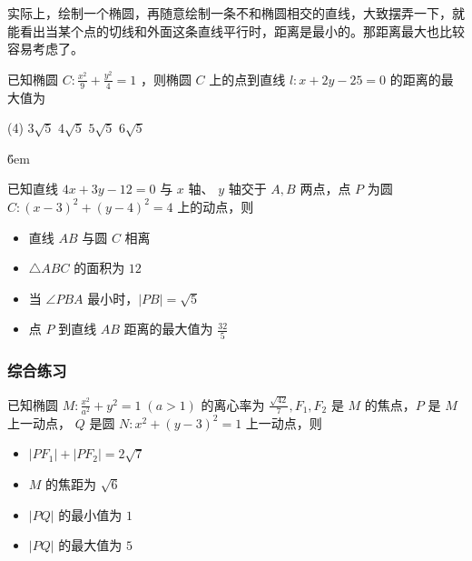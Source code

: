 \begin{tips}
    实际上，绘制一个椭圆，再随意绘制一条不和椭圆相交的直线，大致摆弄一下，就能看出当某个点的切线和外面这条直线平行时，距离是最小的。那距离最大也比较容易考虑了。
\end{tips}

\begin{example}
    已知椭圆 $C: \frac{x^{2}}{9}+\frac{y^{2}}{4}=1$ ，则椭圆 $C$ 上的点到直线 $l: x+2 y-25=0$ 的距离的最大值为
    \begin{tasks}(4)
        \task $3 \sqrt{5}$
        \task $4 \sqrt{5}$
        \task $5 \sqrt{5}$
        \task $6 \sqrt{5}$
    \end{tasks}
\end{example}

\v{6em}

\begin{problem}
已知直线 $4x+3y-12=0$ 与 $x$ 轴、 $y$ 轴交于 $A, B$ 两点，点 $P$ 为圆 $C:(x-3)^{2}+(y-4)^{2}=4$ 上的动点，则
\begin{itemize}
    \item 直线 $AB$ 与圆 $C$ 相离
    \item $\triangle ABC$ 的面积为 $12$
    \item 当 $\angle PBA$ 最小时，$|PB|=\sqrt{5}$
    \item 点 $P$ 到直线 $AB$ 距离的最大值为 $\frac{32}{5}$
\end{itemize}
\end{problem}

\subsubsection{综合练习}

\begin{problem}
已知椭圆 $M: \frac{x^{2}}{a^{2}}+y^{2}=1\;(a>1)$ 的离心率为 $\frac{\sqrt{42}}{7}, F_{1}, F_{2}$ 是 $M$ 的焦点，$P$ 是 $M$ 上一动点， $Q$ 是圆 $N: x^{2}+(y-3)^{2}=1$ 上一动点，则
\begin{itemize}
    \item $|PF_{1}|+|PF_{2}|=2 \sqrt{7}$
    \item $M$ 的焦距为 $\sqrt{6}$
    \item $|PQ|$ 的最小值为 $1$
    \item $|PQ|$ 的最大值为 $5$
\end{itemize}
\end{problem}

\vspace{1em}

